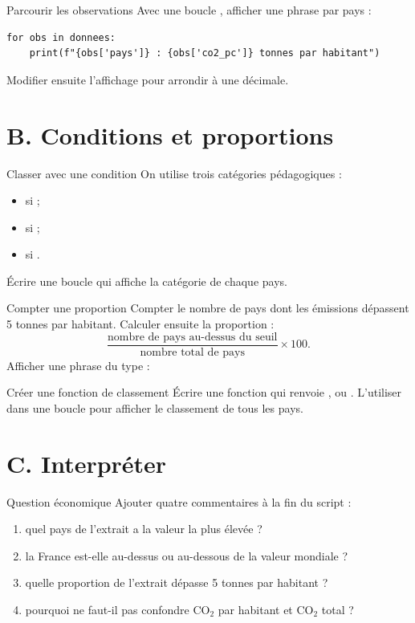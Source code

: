 \documentclass[11pt,a4paper]{article}
\begin{document}
\begin{mandatoryexercise}{Parcourir les observations}
Avec une boucle , afficher une phrase par pays :
\begin{lstlisting}
for obs in donnees:
    print(f"{obs['pays']} : {obs['co2_pc']} tonnes par habitant")
\end{lstlisting}
Modifier ensuite l'affichage pour arrondir à une décimale.
\end{mandatoryexercise}

\section*{B. Conditions et proportions}

\begin{mandatoryexercise}{Classer avec une condition}
On utilise trois catégories pédagogiques :
\begin{itemize}
  \item {} si  ;
  \item {} si  ;
  \item {} si .
\end{itemize}
Écrire une boucle qui affiche la catégorie de chaque pays.
\end{mandatoryexercise}

\begin{mandatoryexercise}{Compter une proportion}
Compter le nombre de pays dont les émissions dépassent 5 tonnes par habitant. Calculer ensuite la proportion :
\[
\frac{\text{nombre de pays au-dessus du seuil}}{\text{nombre total de pays}} \times 100.
\]
Afficher une phrase du type : 
\end{mandatoryexercise}

\begin{mandatoryexercise}{Créer une fonction de classement}
Écrire une fonction  qui renvoie ,  ou . L'utiliser dans une boucle pour afficher le classement de tous les pays.
\end{mandatoryexercise}

\section*{C. Interpréter}

\begin{mandatoryexercise}{Question économique}
Ajouter quatre commentaires à la fin du script :
\begin{enumerate}
  \item quel pays de l'extrait a la valeur la plus élevée ?
  \item la France est-elle au-dessus ou au-dessous de la valeur mondiale ?
  \item quelle proportion de l'extrait dépasse 5 tonnes par habitant ?
  \item pourquoi ne faut-il pas confondre CO$_2$ par habitant et CO$_2$ total ?
\end{enumerate}
\end{mandatoryexercise}
\end{document}
